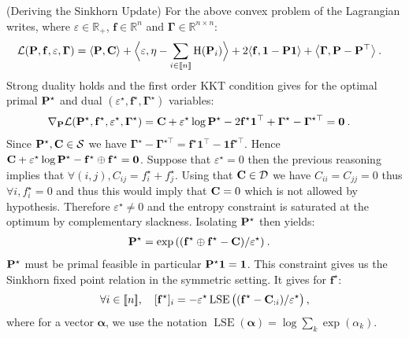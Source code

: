 \begin{remark}{(Deriving the Sinkhorn Update)}
For the above convex problem of  the Lagrangian writes, where $\varepsilon \in \mathbb{R}_+$, $\mathbf{f} \in \mathbb{R}^n$ and $\bm{\Gamma} \in \mathbb{R}^{n \times n}$:
\begin{align}
    \mathcal{L}(\mathbf{P}, \mathbf{f}, \varepsilon, \bm{\Gamma}) &= \langle \mathbf{P}, \mathbf{C} \rangle + \Big\langle \varepsilon, \eta - \sum_{i \in {[\![n]\!]}} \operatorname{H}(\mathbf{P}_i) \Big\rangle + 2\langle \mathbf{f}, \bm{1} - \mathbf{P} \bm{1} \rangle + \big\langle \bm{\Gamma}, \mathbf{P} - \mathbf{P}^\top \big\rangle \:.
\end{align}
Strong duality holds and the first order KKT condition gives for the optimal primal $\mathbf{P}^\star$ and dual $(\varepsilon^\star, \mathbf{f}^\star, \bm{\Gamma}^\star)$ variables: 
\begin{align}
    \nabla_{\mathbf{P}} \mathcal{L}(\mathbf{P}^\star, \mathbf{f}^\star, \varepsilon^\star, \bm{\Gamma}^\star) &= \mathbf{C} + \varepsilon^\star \log{\mathbf{P}^\star} - 2\mathbf{f}^\star \bm{1}^\top + \bm{\Gamma}^\star - \bm{\Gamma}^{\star\top} = \bm{0} \:.
\end{align}
Since $\mathbf{P}^\star, \mathbf{C} \in \mathcal{S}$ we have $\bm{\Gamma}^\star - \bm{\Gamma}^{\star\top} = \mathbf{f}^\star \bm{1}^\top - \bm{1}\mathbf{f}^{\star \top}$. Hence $\mathbf{C} + \varepsilon^\star \log{\mathbf{P}^\star} - \mathbf{f}^\star \oplus \mathbf{f}^\star = \bm{0}$. Suppose that $\varepsilon^\star = 0$ then the previous reasoning implies that $\forall (i,j), C_{ij} = f_i^\star + f_j^\star$. Using that $\mathbf{C} \in \mathcal{D}$ we have $C_{ii} = C_{jj} = 0$ thus $\forall i,  f^\star_i = 0$ and thus this would imply that $\mathbf{C} = 0$ which is not allowed by hypothesis. Therefore $\varepsilon^\star \neq 0$ and the entropy constraint is saturated at the optimum by complementary slackness. Isolating $\mathbf{P}^\star$ then yields:
\begin{align}
    \mathbf{P}^{\star} &= \exp{\left( (\mathbf{f}^\star \oplus \mathbf{f}^{\star} - \mathbf{C}) / \varepsilon^\star \right)} \:.
\end{align}
$\mathbf{P}^\star$ must be primal feasible in particular $\mathbf{P}^\star \bm{1} = \bm{1}$. This constraint gives us the Sinkhorn fixed point relation in the symmetric setting. It gives for $\mathbf{f}^\star$:
\begin{align}
    \forall i \in {[\![n]\!]}, \quad [\mathbf{f}^\star]_i = - \varepsilon^\star \operatorname{LSE} \big((\mathbf{f}^\star - \mathbf{C}_{:i}) / \varepsilon^\star \big)\,,
\end{align}
where for a vector $\bm{\alpha}$, we use the notation
$\operatorname{LSE}(\bm{\alpha}) = \log \sum_{k} \exp (\alpha_k)$.
\end{remark}

